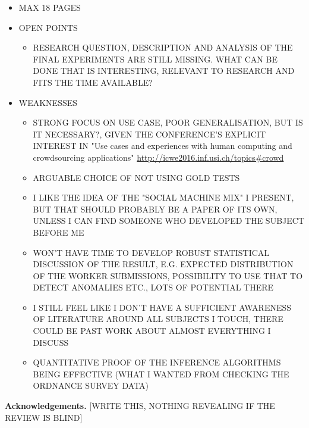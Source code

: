 \documentclass{llncs}
\begin{document}
\begin{itemize}
    \item MAX 18 PAGES
    \item OPEN POINTS
        \begin{itemize}
            \item RESEARCH QUESTION, DESCRIPTION AND ANALYSIS OF THE FINAL EXPERIMENTS ARE STILL MISSING. WHAT CAN BE DONE THAT IS INTERESTING, RELEVANT TO RESEARCH AND FITS THE TIME AVAILABLE?
        \end{itemize}
    \item WEAKNESSES 
        \begin{itemize}
            \item STRONG FOCUS ON USE CASE, POOR GENERALISATION, BUT IS IT NECESSARY?, GIVEN THE CONFERENCE'S EXPLICIT INTEREST IN "Use cases and experiences with human computing and crowdsourcing applications" \url{http://icwe2016.inf.usi.ch/topics#crowd}
            \item ARGUABLE CHOICE OF NOT USING GOLD TESTS
            \item I LIKE THE IDEA OF THE "SOCIAL MACHINE MIX" I PRESENT, BUT THAT SHOULD PROBABLY BE A PAPER OF ITS OWN, UNLESS I CAN FIND SOMEONE WHO DEVELOPED THE SUBJECT BEFORE ME
            \item WON'T HAVE TIME TO DEVELOP ROBUST STATISTICAL DISCUSSION OF THE RESULT, E.G. EXPECTED DISTRIBUTION OF THE WORKER SUBMISSIONS, POSSIBILITY TO USE THAT TO DETECT ANOMALIES ETC., LOTS OF POTENTIAL THERE
            \item I STILL FEEL LIKE I DON'T HAVE A SUFFICIENT AWARENESS OF LITERATURE AROUND ALL SUBJECTS I TOUCH, THERE COULD BE PAST WORK ABOUT ALMOST EVERYTHING I DISCUSS
            \item QUANTITATIVE PROOF OF THE INFERENCE ALGORITHMS BEING EFFECTIVE (WHAT I WANTED FROM CHECKING THE ORDNANCE SURVEY DATA)
        \end{itemize}
\end{itemize}








\textbf{Acknowledgements.} [WRITE THIS, NOTHING REVEALING IF THE REVIEW IS BLIND]


\end{document}
